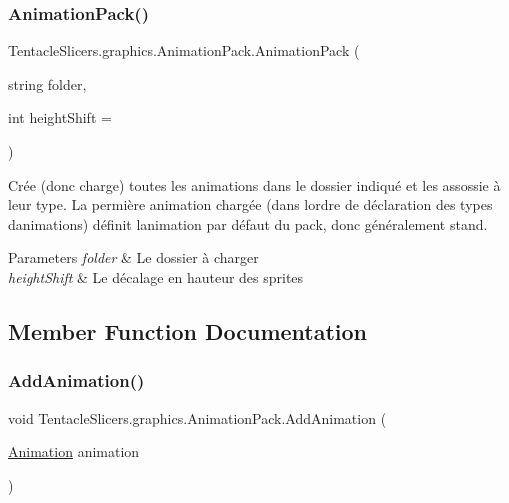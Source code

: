 \subsubsection{\texorpdfstring{Animation\+Pack()}{AnimationPack()}\hspace{0.1cm}{\footnotesize\ttfamily [2/2]}}
{\footnotesize\ttfamily Tentacle\+Slicers.\+graphics.\+Animation\+Pack.\+Animation\+Pack (\begin{DoxyParamCaption}\item[{string}]{folder,  }\item[{int}]{height\+Shift = {} }\end{DoxyParamCaption})}



Crée (donc charge) toutes les animations dans le dossier indiqué et les assossie à leur type. La permière animation chargée (dans l\textquotesingle{}ordre de déclaration des types d\textquotesingle{}animations) définit l\textquotesingle{}animation par défaut du pack, donc généralement stand. 


\begin{DoxyParams}{Parameters}
{\em folder} & Le dossier à charger \\
\hline
{\em height\+Shift} & Le décalage en hauteur des sprites \\
\hline
\end{DoxyParams}


\subsection{Member Function Documentation}
\mbox{\label{class_tentacle_slicers_1_1graphics_1_1_animation_pack_a0c54409bced801c3e5692a8b43837e89}} 
\subsubsection{\texorpdfstring{Add\+Animation()}{AddAnimation()}}
{\footnotesize\ttfamily void Tentacle\+Slicers.\+graphics.\+Animation\+Pack.\+Add\+Animation (\begin{DoxyParamCaption}\item[{\hyperlink{class_tentacle_slicers_1_1graphics_1_1_animation}{Animation}}]{animation }\end{DoxyParamCaption})}



